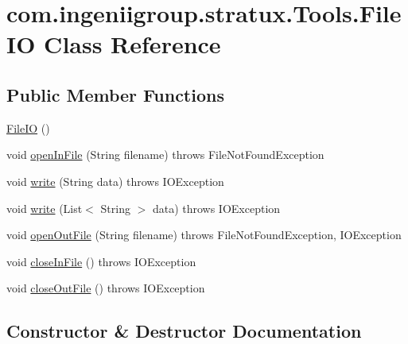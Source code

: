 \hypertarget{classcom_1_1ingeniigroup_1_1stratux_1_1_tools_1_1_file_i_o}{}\section{com.\+ingeniigroup.\+stratux.\+Tools.\+File\+IO Class Reference}
\label{classcom_1_1ingeniigroup_1_1stratux_1_1_tools_1_1_file_i_o}
\subsection*{Public Member Functions}
\begin{DoxyCompactItemize}
\item 
\hyperlink{classcom_1_1ingeniigroup_1_1stratux_1_1_tools_1_1_file_i_o_a7de61fd2f8dfae8361d258bdef4fa27c}{File\+IO} ()
\item 
void \hyperlink{classcom_1_1ingeniigroup_1_1stratux_1_1_tools_1_1_file_i_o_ac70a76488327d17823938bb9f0cb4583}{open\+In\+File} (String filename)  throws File\+Not\+Found\+Exception
\item 
void \hyperlink{classcom_1_1ingeniigroup_1_1stratux_1_1_tools_1_1_file_i_o_a75ea9165c6b5beea6de12b8fb8a305ce}{write} (String data)  throws I\+O\+Exception
\item 
void \hyperlink{classcom_1_1ingeniigroup_1_1stratux_1_1_tools_1_1_file_i_o_aa9207b202a5e47512b8a05224d2ba8d1}{write} (List$<$ String $>$ data)  throws I\+O\+Exception
\item 
void \hyperlink{classcom_1_1ingeniigroup_1_1stratux_1_1_tools_1_1_file_i_o_a73b85b9a6da4e8a7dbf2d0fb90ce26f6}{open\+Out\+File} (String filename)  throws File\+Not\+Found\+Exception, I\+O\+Exception 
\item 
void \hyperlink{classcom_1_1ingeniigroup_1_1stratux_1_1_tools_1_1_file_i_o_a8e8f775f290ae51bce77533a6ac0af6c}{close\+In\+File} ()  throws I\+O\+Exception 
\item 
void \hyperlink{classcom_1_1ingeniigroup_1_1stratux_1_1_tools_1_1_file_i_o_a993003044cef1a0ba1e4193e42412bb9}{close\+Out\+File} ()  throws I\+O\+Exception 
\end{DoxyCompactItemize}


\subsection{Constructor \& Destructor Documentation}
\mbox{\label{classcom_1_1ingeniigroup_1_1stratux_1_1_tools_1_1_file_i_o_a7de61fd2f8dfae8361d258bdef4fa27c}} 
